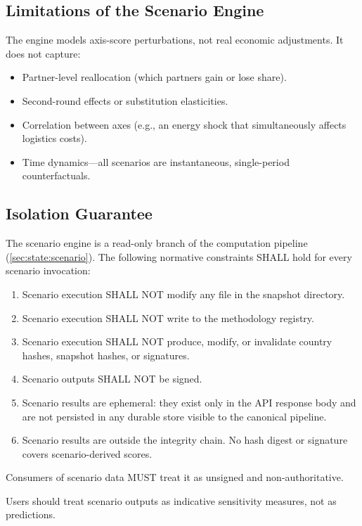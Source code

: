 \subsection{Limitations of the Scenario Engine}\label{sec:scenario:limits}

The engine models axis-score perturbations, not real economic adjustments.
It does not capture:

\begin{itemize}
  \item Partner-level reallocation (which partners gain or lose share).
  \item Second-round effects or substitution elasticities.
  \item Correlation between axes (e.g., an energy shock that simultaneously
    affects logistics costs).
  \item Time dynamics---all scenarios are instantaneous, single-period
    counterfactuals.
\end{itemize}

\subsection{Isolation Guarantee}\label{sec:scenario:isolation}

The scenario engine is a read-only branch of the computation pipeline
(\cref{sec:state:scenario}).  The following normative constraints SHALL
hold for every scenario invocation:

\begin{enumerate}
  \item Scenario execution SHALL NOT modify any file in the snapshot
    directory.
  \item Scenario execution SHALL NOT write to the methodology registry.
  \item Scenario execution SHALL NOT produce, modify, or invalidate
    country hashes, snapshot hashes, or signatures.
  \item Scenario outputs SHALL NOT be signed.
  \item Scenario results are ephemeral: they exist only in the API
    response body and are not persisted in any durable store visible to
    the canonical pipeline.
  \item Scenario results are outside the integrity chain.  No hash
    digest or signature covers scenario-derived scores.
\end{enumerate}

Consumers of scenario data MUST treat it as unsigned and non-authoritative.

Users should treat scenario outputs as indicative sensitivity measures, not
as predictions.